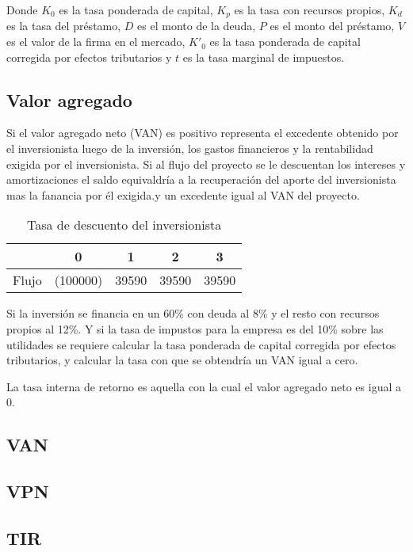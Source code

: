 \documentclass[a4paper, 11pt, oneside]{article}
\begin{document}
Donde $K_0$ es la tasa ponderada de capital, $K_p$ es la tasa con recursos propios, $K_d$ es la tasa del préstamo, $D$ es el monto de la deuda, $P$ es el monto del préstamo, $V$ es el valor de la firma en el mercado, $K'_0$ es la tasa ponderada de capital corregida por efectos tributarios y $t$ es la tasa marginal de impuestos.

\subsection{Valor agregado}

Si el valor agregado neto (VAN) es positivo representa el excedente obtenido por el inversionista luego de la inversión, los gastos financieros y la rentabilidad exigida por el inversionista.
Si al flujo del proyecto se le descuentan los intereses y amortizaciones el saldo equivaldría a la recuperación del aporte del inversionista mas la fanancia por él exigida.y un excedente igual al VAN del proyecto.
\begin{table}
 \begin{tabular}{|c|c|c|c|c|}
  \hline
   & 0 & 1 & 2 & 3 \\
  \hline
  Flujo & (100000) & 39590 & 39590 & 39590 \\
  \hline
 \end{tabular}
  \caption{Tasa de descuento del inversionista}
\end{table}

Si la inversión se financia en un 60\% con deuda al 8\% y el resto con recursos propios al 12\%. Y si la tasa de impustos para la empresa es del 10\% sobre las utilidades se requiere calcular la tasa ponderada de capital corregida por efectos tributarios, y calcular la tasa con que se obtendría un VAN igual a cero.

La tasa interna de retorno es aquella con la cual el valor agregado neto es igual a 0.

\subsection{VAN}

\subsection{VPN}

\subsection{TIR}
\end{document}
